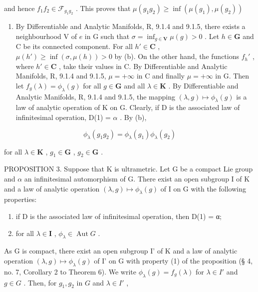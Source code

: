and hence \(f_{1}f_{2}\in \mathcal{F}_{g_{1}g_{2}}\) . This proves that \(\mu (g_1g_2)\geqslant \inf (\mu (g_1),\mu (g_2))\)

\begin{enumerate}
\def\labelenumi{(\alph{enumi})}
\setcounter{enumi}{2}
\tightlist
\item
  By Differentiable and Analytic Manifolds, R, 9.1.4 and 9.1.5, there exists a neighbourhood V of \(e\) in G such that \(\sigma = \inf_{g \in \mathbf{V}} \mu(g) > 0\) . Let \(h \in \mathbf{G}\) and C be its connected component. For all \(h' \in \mathbf{C}\) , \(\mu(h') \geqslant \inf(\sigma, \mu(h)) > 0\) by (b). On the other hand, the functions \(f_h'\) , where \(h' \in \mathbf{C}\) , take their values in C. By Differentiable and Analytic Manifolds, R, 9.1.4 and 9.1.5, \(\mu = +\infty\) in C and finally \(\mu = +\infty\) in G. Then let \(f_g(\lambda) = \phi_{\lambda}(g)\) for all \(g \in \mathbf{G}\) and all \(\lambda \in \mathbf{K}\) . By Differentiable and Analytic Manifolds, R, 9.1.4 and 9.1.5, the mapping \((\lambda, g) \mapsto \phi_{\lambda}(g)\) is a law of analytic operation of K on G. Clearly, if D is the associated law of infinitesimal operation, D(1) = \(\alpha\) . By (b),
\end{enumerate}

\[
\phi_ {\lambda} (g _ {1} g _ {2}) = \phi_ {\lambda} (g _ {1}) \phi_ {\lambda} (g _ {2})
\]

for all \(\lambda \in \mathbf{K}\) , \(g_{1} \in \mathbf{G}\) , \(g_{2} \in \mathbf{G}\) .

PROPOSITION 3. Suppose that K is ultrametric. Let G be a compact Lie group and \(\alpha\) an infinitesimal automorphism of G. There exist an open subgroup I of K and a law of analytic operation \((\lambda, g) \mapsto \phi_{\lambda}(g)\) of I on G with the following properties:

\begin{enumerate}
\def\labelenumi{(\arabic{enumi})}
\item
  if D is the associated law of infinitesimal operation, then D(1) = α;
\item
  for all \(\lambda \in \mathbf{I}\) , \(\phi_{\lambda} \in \operatorname{Aut} G\) .
\end{enumerate}

As G is compact, there exist an open subgroup I' of K and a law of analytic operation \((\lambda, g) \mapsto \phi_{\lambda}(g)\) of I' on G with property (1) of the proposition (§ 4, no. 7, Corollary 2 to Theorem 6). We write \(\phi_{\lambda}(g) = f_{g}(\lambda)\) for \(\lambda \in I'\) and \(g \in G\) . Then, for \(g_{1}, g_{2}\) in \(G\) and \(\lambda \in I'\) ,


